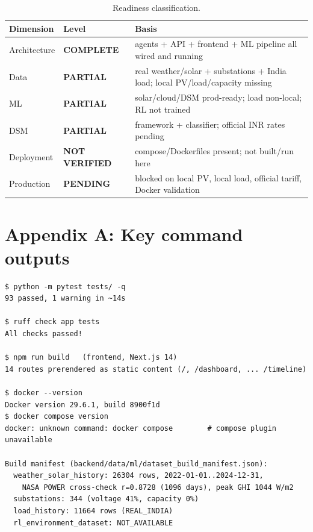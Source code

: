 \documentclass[11pt,a4paper]{article}
\newcommand{\stC}{\textcolor{cok}{\textbf{COMPLETE}}}
\newcommand{\stP}{\textcolor{cpart}{\textbf{PARTIAL}}}
\newcommand{\stPend}{\textcolor{cpart}{\textbf{PENDING}}}
\newcommand{\stNV}{\textcolor{cnv}{\textbf{NOT VERIFIED}}}
\begin{document}
\begin{table}[H]
\centering
\caption{Readiness classification.}
\label{tab:readiness}
\footnotesize
\begin{tabular}{@{}l l p{7.2cm}@{}}
\toprule
\textbf{Dimension} & \textbf{Level} & \textbf{Basis}\\
\midrule
Architecture & \stC & agents + API + frontend + ML pipeline all wired and running\\
Data & \stP & real weather/solar + substations + India load; local PV/load/capacity missing\\
ML & \stP & solar/cloud/DSM prod-ready; load non-local; RL not trained\\
DSM & \stP & framework + classifier; official INR rates pending\\
Deployment & \stNV & compose/Dockerfiles present; not built/run here\\
Production & \stPend & blocked on local PV, local load, official tariff, Docker validation\\
\bottomrule
\end{tabular}
\end{table}

\section*{Appendix A: Key command outputs}
\begin{lstlisting}
$ python -m pytest tests/ -q
93 passed, 1 warning in ~14s

$ ruff check app tests
All checks passed!

$ npm run build   (frontend, Next.js 14)
14 routes prerendered as static content (/, /dashboard, ... /timeline)

$ docker --version
Docker version 29.6.1, build 8900f1d
$ docker compose version
docker: unknown command: docker compose        # compose plugin unavailable

Build manifest (backend/data/ml/dataset_build_manifest.json):
  weather_solar_history: 26304 rows, 2022-01-01..2024-12-31,
    NASA POWER cross-check r=0.8728 (1096 days), peak GHI 1044 W/m2
  substations: 344 (voltage 41%, capacity 0%)
  load_history: 11664 rows (REAL_INDIA)
  rl_environment_dataset: NOT_AVAILABLE
\end{lstlisting}
\end{document}
